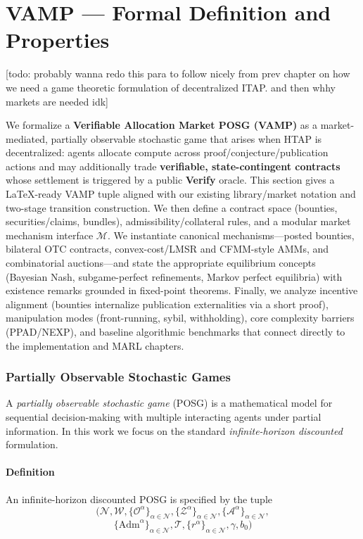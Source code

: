 \chapter{VAMP --- Formal Definition and Properties}\label{chap:vamp}

[todo: probably wanna redo this para to follow nicely from prev chapter on how we need a game theoretic formulation of decentralized ITAP. and then whhy markets are needed idk]


\renewcommand{\proves}{\vdash}
We formalize a \textbf{Verifiable Allocation Market POSG (VAMP)} as a market-mediated, partially observable stochastic game that arises when HTAP is decentralized: agents allocate compute across proof/conjecture/publication actions and may additionally trade \textbf{verifiable, state-contingent contracts} whose settlement is triggered by a public \textbf{Verify} oracle. This section gives a LaTeX-ready VAMP tuple aligned with our existing library/market notation and two-stage transition construction. We then define a contract space (bounties, securities/claims, bundles), admissibility/collateral rules, and a modular market mechanism interface \(\mathcal{M}\). We instantiate canonical mechanisms---posted bounties, bilateral OTC contracts, convex-cost/LMSR and CFMM-style AMMs, and combinatorial auctions---and state the appropriate equilibrium concepts (Bayesian Nash, subgame-perfect refinements, Markov perfect equilibria) with existence remarks grounded in fixed-point theorems. Finally, we analyze incentive alignment (bounties internalize publication externalities via a short proof), manipulation modes (front-running, sybil, withholding), core complexity barriers (PPAD/NEXP), and baseline algorithmic benchmarks that connect directly to the implementation and MARL chapters.


\subsection{Partially Observable Stochastic Games}


A \emph{partially observable stochastic game} (POSG) is a mathematical model for sequential decision-making with multiple interacting agents under partial information. In this work we focus on the standard \emph{infinite-horizon discounted} formulation.
\subsubsection{Definition}

An infinite-horizon discounted POSG is specified by the tuple
\[
\Big(\mathcal{N}, \mathcal{W},\{\mathcal{O}^\alpha\}_{\alpha\in \mathcal{N}},\{\mathcal{Z}^\alpha\}_{\alpha\in \mathcal{N}},
\{\mathcal{A}^\alpha\}_{\alpha\in \mathcal{N}},\]\[\{\mathrm{Adm}^\alpha\}_{\alpha\in\mathcal{N}},\mathcal{T},
\{r^\alpha\}_{\alpha\in \mathcal{N}},\gamma,b_0\Big)    
\]

